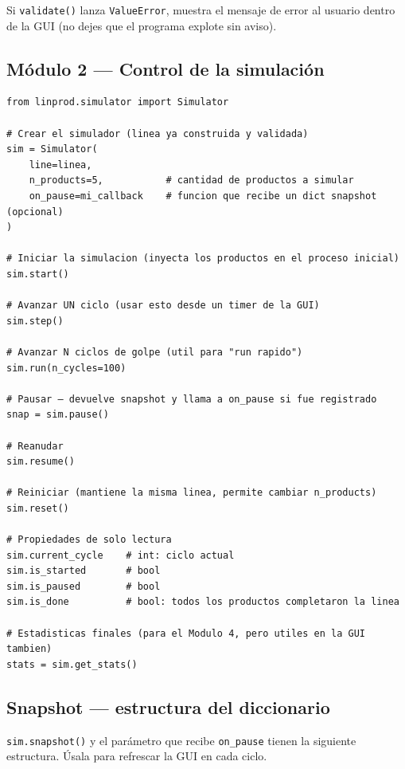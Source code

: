 \documentclass[12pt,letterpaper]{article}
\begin{document}
Si \texttt{validate()} lanza \texttt{ValueError}, muestra el mensaje de error
al usuario dentro de la GUI (no dejes que el programa explote sin aviso).

\subsection{Módulo 2 — Control de la simulación}

\begin{lstlisting}
from linprod.simulator import Simulator

# Crear el simulador (linea ya construida y validada)
sim = Simulator(
    line=linea,
    n_products=5,           # cantidad de productos a simular
    on_pause=mi_callback    # funcion que recibe un dict snapshot (opcional)
)

# Iniciar la simulacion (inyecta los productos en el proceso inicial)
sim.start()

# Avanzar UN ciclo (usar esto desde un timer de la GUI)
sim.step()

# Avanzar N ciclos de golpe (util para "run rapido")
sim.run(n_cycles=100)

# Pausar — devuelve snapshot y llama a on_pause si fue registrado
snap = sim.pause()

# Reanudar
sim.resume()

# Reiniciar (mantiene la misma linea, permite cambiar n_products)
sim.reset()

# Propiedades de solo lectura
sim.current_cycle    # int: ciclo actual
sim.is_started       # bool
sim.is_paused        # bool
sim.is_done          # bool: todos los productos completaron la linea

# Estadisticas finales (para el Modulo 4, pero utiles en la GUI tambien)
stats = sim.get_stats()
\end{lstlisting}

\subsection{Snapshot — estructura del diccionario}

\texttt{sim.snapshot()} y el parámetro que recibe \texttt{on\_pause} tienen la
siguiente estructura. Úsala para refrescar la GUI en cada ciclo.
\end{document}
